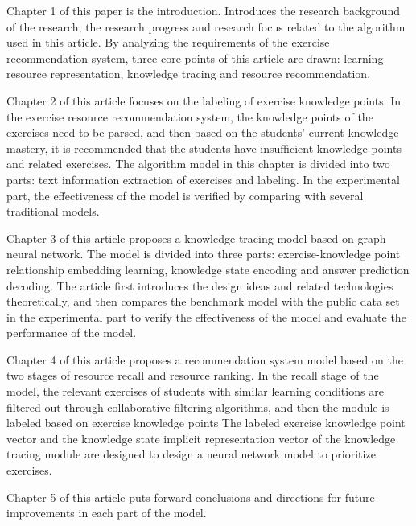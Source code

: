 Chapter 1 of this paper is the introduction. Introduces the research background of the research, the research progress and research focus related to the algorithm used in this article. By analyzing the requirements of the exercise recommendation system, three core points of this article are drawn: learning resource representation, knowledge tracing and resource recommendation.

Chapter 2 of this article focuses on the labeling of exercise knowledge points. In the exercise resource recommendation system, the knowledge points of the exercises need to be parsed, and then based on the students' current knowledge mastery, it is recommended that the students have insufficient knowledge points and related exercises. The algorithm model in this chapter is divided into two parts: text information extraction of exercises and labeling. In the experimental part, the effectiveness of the model is verified by comparing with several traditional models.

Chapter 3 of this article proposes a knowledge tracing model based on graph neural network. The model is divided into three parts: exercise-knowledge point relationship embedding learning, knowledge state encoding and answer prediction decoding. The article first introduces the design ideas and related technologies theoretically, and then compares the benchmark model with the public data set in the experimental part to verify the effectiveness of the model and evaluate the performance of the model.

Chapter 4 of this article proposes a recommendation system model based on the two stages of resource recall and resource ranking. In the recall stage of the model, the relevant exercises of students with similar learning conditions are filtered out through collaborative filtering algorithms, and then the module is labeled based on exercise knowledge points The labeled exercise knowledge point vector and the knowledge state implicit representation vector of the knowledge tracing module are designed to design a neural network model to prioritize exercises.

Chapter 5 of this article puts forward conclusions and directions for future improvements in each part of the model.

